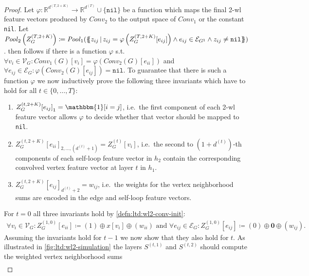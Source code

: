 \begin{proof}
	Let $\varphi: \mathbb{R}^{d^{(T, 2 + K)}} \to \mathbb{R}^{d^{(T)}} \cup \{ \texttt{nil} \}$ be a function which maps the final 2-\acs{wl} feature vectors produced by $\mathit{Conv}_2$ to the output space of $\mathit{Conv}_1$ or the constant \texttt{nil}.
	Let $\mathit{Pool}_2\left(Z_G^{(T,2+K)}\right) \coloneqq \mathit{Pool}_1(\ldblbrace z_{ij}\, |\, z_{ij} = \varphi\left(Z_G^{(T,2+K)}[e_{ij}]\right) \land e_{ij} \in \mathcal{E}_{G^1} \land z_{ij} \neq \texttt{nil} \rdblbrace)$.
	 then follows if there is a function $\varphi$ s.t.\ $\forall v_i \in \mathcal{V}_G: \mathit{Conv}_1(G)[v_i] = \varphi(\mathit{Conv}_2(G)[e_{ii}])$ and $\forall e_{ij} \in \mathcal{E}_G: \varphi(\mathit{Conv}_2(G)[e_{ij}]) = \texttt{nil}$.
	To guarantee that there is such a function $\varphi$ we now inductively prove the following three invariants which have to hold for all $t \in \{ 0, \dots, T \}$:
	\begin{enumerate}[label={(P\arabic*)}]
		\item\label{inv:ltd:wl2-simulation:indicator}
			${Z_G^{(t,2+K)}[e_{ij}]}_1 = \mathbbm{1}[i = j]$, i.e.\ the first component of each 2-\acs{wl} feature vector allows $\varphi$ to decide whether that vector should be mapped to \texttt{nil}.
		\item\label{inv:ltd:wl2-simulation:feature}
			${Z_G^{(t,2+K)}[e_{ii}]}_{2, \dots, (d^{(t)} + 1)} = Z_G^{(t)}[v_{i}]$, i.e.\ the second to $(1 + d^{(t)})$-th components of each self-loop feature vector in $h_2$ contain the corresponding convolved vertex feature vector at layer $t$ in $h_1$.
		\item\label{inv:ltd:wl2-simulation:weight}
			${Z_G^{(t,2+K)}[e_{ij}]}_{d^{(t)} + 2} = w_{ij}$, i.e.\ the weights for the vertex neighborhood sums are encoded in the edge and self-loop feature vectors.
	\end{enumerate}
	For $t = 0$ all three invariants hold by \cref{defn:ltd:wl2-conv-init}:
	\begin{align*}
		\forall v_i \in \mathcal{V}_G: Z_G^{(1, 0)}[e_{ii}] \coloneqq (1) \oplus x[v_i] \oplus (w_{ii})
		\text{ and }
		\forall e_{ij} \in \mathcal{E}_G: Z_G^{(1, 0)}[e_{ij}] \coloneqq (0) \oplus \mathbf{0} \oplus (w_{ij})
		\text{.}
	\end{align*}
	Assuming the invariants hold for $t - 1$ we now show that they also hold for $t$.
	As illustrated in \cref{fig:ltd:wl2-simulation} the layers $S^{(t, 1)}$ and $S^{(t, 2)}$ should compute the weighted vertex neighborhood sums
	\begin{align*}

\end{align*}
\end{proof}
